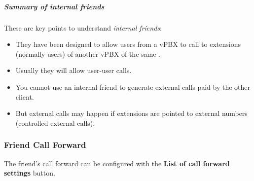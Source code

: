 \documentclass[letterpaper,10pt,english]{sphinxmanual}
\begin{document}
\subparagraph{Summary of internal friends}
\label{administration_portal/client/vpbx/routing_endpoints/friends/internal_friends:summary-of-internal-friends}
These are key points to understand \emph{internal friends}:
\begin{itemize}
\item {} 
They have been designed to allow users from a vPBX to call to extensions (normally users)
of another vPBX of the same {\hyperref[administration_portal/brand/settings/corporations:corporations]{}}.

\item {} 
Usually they will allow user-user calls.

\item {} 
You cannot use an internal friend to generate external calls paid by the other client.

\item {} 
But external calls may happen if extensions are pointed to external numbers (controlled external calls).

\end{itemize}


\subsubsection{Friend Call Forward}
\label{administration_portal/client/vpbx/routing_endpoints/friends/index:friend-call-forward}
The friend's call forward can be configured with the \textbf{List of call forward settings}  button.
\end{document}
